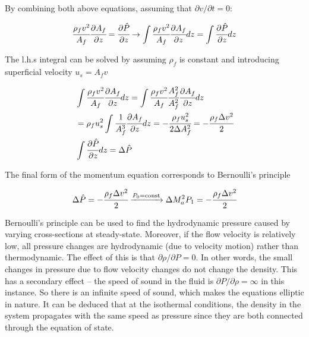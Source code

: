 \documentclass[../Article_Model_Parameters.tex]{subfiles}
\begin{document}
	By combining both above equations, assuming that $\partial v / \partial t = 0$:
	
	{\footnotesize
		\begin{equation*}
			\cfrac{\rho_f v^2}{A_f} \cfrac{\partial A_f}{\partial z} = \cfrac{\partial \hat{P}}{\partial z} \rightarrow \int	\cfrac{\rho_f v^2}{A_f} \cfrac{\partial A_f}{\partial z} dz = \int \cfrac{\partial\hat{P}}{\partial z} dz
		\end{equation*}
	}
	
	The l.h.s integral can be solved by assuming $\rho_f$ is constant and introducing superficial velocity $u_s=A_f v$
	
	{\footnotesize
		\begin{align*}
			& \int	\cfrac{\rho_f v^2}{A_f} \cfrac{\partial A_f}{\partial z} dz = \int	\cfrac{\rho_f v^2}{A_f} \cfrac{A_f^2}{A_f^2} \cfrac{\partial A_f}{\partial z} dz \\
			&= \rho_f u_s^2  \int \cfrac{1}{A_f^3} \cfrac{\partial A_f}{\partial z} dz = - \cfrac{\rho_f u_s^2}{2 \Delta A_f^2} = - \cfrac{\rho_f \Delta v^2}{2} \\
			& \int \cfrac{\partial \hat{P}}{\partial z} dz = \Delta \hat{P}
		\end{align*}
	}
	
	The final form of the momentum equation corresponds to Bernoulli's principle
	
	{\footnotesize
		\begin{equation*}
			\Delta \hat{P} = - \cfrac{\rho_f \Delta v^2}{2} \xrightarrow[]{P_0 = \text{const}} \Delta M_a^2 P_1 = - \cfrac{\rho_f \Delta v^2}{2}
		\end{equation*}
	}
	
	Bernoulli's principle can be used to find the hydrodynamic pressure caused by varying cross-sections at steady-state. Moreover, if the flow velocity is relatively low, all pressure changes are hydrodynamic (due to velocity motion) rather than thermodynamic. The effect of this is that $\partial \rho / \partial P = 0$. In other words, the small changes in pressure due to flow velocity changes do not change the density. This has a secondary effect -- the speed of sound in the fluid is $\partial P/\partial \rho = \infty$ in this instance. So there is an infinite speed of sound, which makes the equations elliptic in nature. It can be deduced that at the isothermal conditions, the density in the system propagates with the same speed as pressure since they are both connected through the equation of state. 
	
\end{document}
